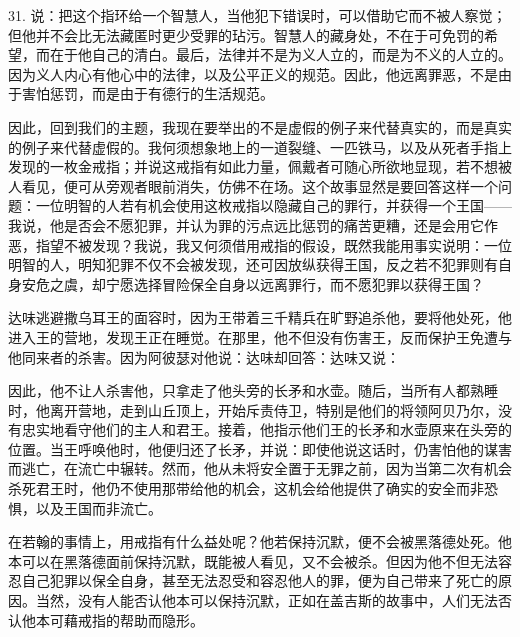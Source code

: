 31. 说：把这个指环给一个智慧人，当他犯下错误时，可以借助它而不被人察觉；但他并不会比无法藏匿时更少受罪的玷污。智慧人的藏身处，不在于可免罚的希望，而在于他自己的清白。最后，法律并不是为义人立的，而是为不义的人立的。 因为义人内心有他心中的法律，以及公平正义的规范。因此，他远离罪恶，不是由于害怕惩罚，而是由于有德行的生活规范。\par

因此，回到我们的主题，我现在要举出的不是虚假的例子来代替真实的，而是真实的例子来代替虚假的。我何须想象地上的一道裂缝、一匹铁马，以及从死者手指上发现的一枚金戒指；并说这戒指有如此力量，佩戴者可随心所欲地显现，若不想被人看见，便可从旁观者眼前消失，仿佛不在场。这个故事显然是要回答这样一个问题：一位明智的人若有机会使用这枚戒指以隐藏自己的罪行，并获得一个王国——我说，他是否会不愿犯罪，并认为罪的污点远比惩罚的痛苦更糟，还是会用它作恶，指望不被发现？我说，我又何须借用戒指的假设，既然我能用事实说明：一位明智的人，明知犯罪不仅不会被发现，还可因放纵获得王国，反之若不犯罪则有自身安危之虞，却宁愿选择冒险保全自身以远离罪行，而不愿犯罪以获得王国？\par

达味逃避撒乌耳王的面容时，因为王带着三千精兵在旷野追杀他，要将他处死，他进入王的营地，发现王正在睡觉。在那里，他不但没有伤害王，反而保护王免遭与他同来者的杀害。因为阿彼瑟对他说：达味却回答：达味又说：\par

因此，他不让人杀害他，只拿走了他头旁的长矛和水壶。随后，当所有人都熟睡时，他离开营地，走到山丘顶上，开始斥责侍卫，特别是他们的将领阿贝乃尔，没有忠实地看守他们的主人和君王。接着，他指示他们王的长矛和水壶原来在头旁的位置。当王呼唤他时，他便归还了长矛，并说：即使他说这话时，仍害怕他的谋害而逃亡，在流亡中辗转。然而，他从未将安全置于无罪之前，因为当第二次有机会杀死君王时，他仍不使用那带给他的机会，这机会给他提供了确实的安全而非恐惧，以及王国而非流亡。\par

在若翰的事情上，用戒指有什么益处呢？他若保持沉默，便不会被黑落德处死。他本可以在黑落德面前保持沉默，既能被人看见，又不会被杀。但因为他不但无法容忍自己犯罪以保全自身，甚至无法忍受和容忍他人的罪，便为自己带来了死亡的原因。当然，没有人能否认他本可以保持沉默，正如在盖吉斯的故事中，人们无法否认他本可藉戒指的帮助而隐形。\par

